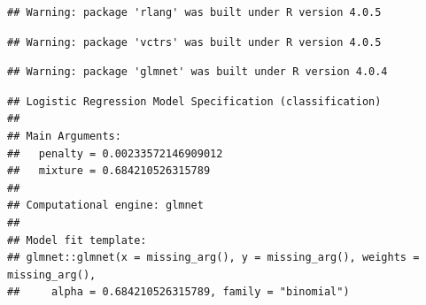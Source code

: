 \documentclass[
  11pt,
]{article}
\newenvironment{Shaded}{\begin{snugshade}}{\end{snugshade}}
\newcommand{\DataTypeTok}[1]{\textcolor[rgb]{0.13,0.29,0.53}{#1}}
\newcommand{\KeywordTok}[1]{\textcolor[rgb]{0.13,0.29,0.53}{\textbf{#1}}}
\newcommand{\NormalTok}[1]{#1}
\newcommand{\OperatorTok}[1]{\textcolor[rgb]{0.81,0.36,0.00}{\textbf{#1}}}
\newcommand{\StringTok}[1]{\textcolor[rgb]{0.31,0.60,0.02}{#1}}
\begin{document}
\begin{verbatim}
## Warning: package 'rlang' was built under R version 4.0.5
\end{verbatim}

\begin{verbatim}
## Warning: package 'vctrs' was built under R version 4.0.5
\end{verbatim}

\begin{verbatim}
## Warning: package 'glmnet' was built under R version 4.0.4
\end{verbatim}

\begin{Shaded}
\end{Shaded}

\begin{verbatim}
## Logistic Regression Model Specification (classification)
## 
## Main Arguments:
##   penalty = 0.00233572146909012
##   mixture = 0.684210526315789
## 
## Computational engine: glmnet 
## 
## Model fit template:
## glmnet::glmnet(x = missing_arg(), y = missing_arg(), weights = missing_arg(), 
##     alpha = 0.684210526315789, family = "binomial")
\end{verbatim}

\begin{Shaded}
\end{Shaded}
\end{document}
